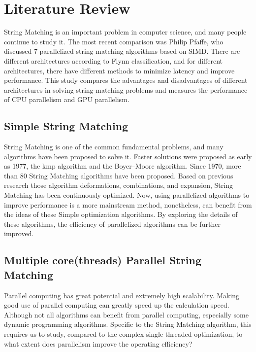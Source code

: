 \documentclass[11pt]{article}       %
\begin{document}
\section{Literature Review} \label{litrev}

String Matching is an important problem in computer science, and many people continue to study it. The most recent comparison was Philip Pfaffe, who discussed 7 parallelized string matching algorithms based on SIMD\cite{Matching}. There are different architectures according to Flynn classification, and for different architectures, there have different methods to minimize latency and improve performance. This study compares the advantages and disadvantages of different architectures in solving string-matching problems and measures the performance of CPU parallelism and GPU parallelism. \\

\subsection{Simple String Matching}\label{Simple}
String Matching is one of the common fundamental problems, and many algorithms have been proposed to solve it. Faster solutions were proposed as early as 1977, the kmp algorithm and the Boyer–Moore algorithm\cite{Matching}. Since 1970, more than 80 String Matching algorithms have been proposed. Based on previous research those algorithm deformations, combinations, and expansion, String Matching has been continuously optimized. Now, using parallelized algorithms to improve performance is a more mainstream method\cite{Matching}, nonetheless, can benefit from the ideas of these Simple optimization algorithms. By exploring the details of these algorithms, the efficiency of parallelized algorithms can be further improved. \\

\subsection{Multiple core(threads) Parallel String Matching}\label{Multiple}
Parallel computing has great potential and extremely high scalability. Making good use of parallel computing can greatly speed up the calculation speed. Although not all algorithms can benefit from parallel computing, especially some dynamic programming algorithms. Specific to the String Matching algorithm, this requires us to study, compared to the complex single-threaded optimization, to what extent does parallelism improve the operating efficiency? \\
\end{document}
